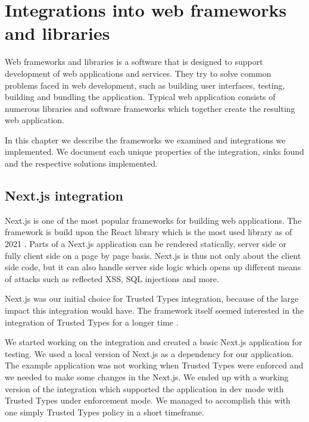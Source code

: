 \chapter{Integrations into web frameworks and libraries}

Web frameworks and libraries is a software that is designed to support development of web
applications and services. They try to solve common problems faced in web development, such as
building user interfaces, testing, building and bundling the application. Typical web application
consists of numerous libraries and software frameworks which together create the resulting web
application.

In this chapter we describe the frameworks we examined and integrations we implemented. We document
each unique properties of the integration, sinks found and the respective solutions implemented.

\section{Next.js integration}

Next.js is one of the most popular frameworks for building web applications. The framework is build
upon the React library which is the most used library as of 2021 \cite{react_most_used_2021}. Parts
of a Next.js application can be rendered statically, server side or fully client side on a page by
page basis. Next.js is thus not only about the client side code, but it can also handle server side
logic which opens up different means of attacks such as reflected XSS, SQL injections and more.

Next.js was our initial choice for Trusted Types integration, because of the large impact this
integration would have. The framework itself seemed interested in the integration of Trusted Types
for a longer time \cite{nextjs_tt_pr_2020}.

We started working on the integration and created a basic Next.js application for testing. We used a
local version of Next.js as a dependency for our application. The example application was not
working when Trusted Types were enforced and we needed to make some changes in the Next.js. We ended
up with a working version of the integration which supported the application in dev mode with
Trusted Types under enforcement mode. We managed to accomplish this with one simply Trusted Types
policy in a short timeframe.

